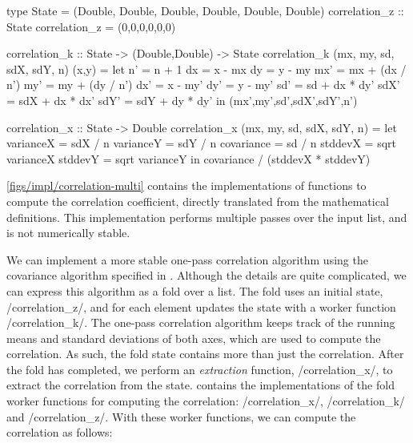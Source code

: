 
\begin{haskell}[float,label=figs/impl/correlation,caption=One-pass correlation implementation]
type State = (Double, Double, Double, Double, Double, Double)
correlation_z :: State
correlation_z = (0,0,0,0,0,0)

correlation_k :: State -> (Double,Double) -> State
correlation_k (mx, my, sd, sdX, sdY, n) (x,y) =
 let n'   = n   + 1
     dx   = x   - mx
     dy   = y   - my
     mx'  = mx  + (dx / n')
     my'  = my  + (dy / n')
     dx'  = x   - my'
     dy'  = y   - my'
     sd'  = sd  + dx * dy'
     sdX' = sdX + dx * dx'
     sdY' = sdY + dy * dy'
 in (mx',my',sd',sdX',sdY',n')

correlation_x :: State -> Double
correlation_x (mx, my, sd, sdX, sdY, n) =
  let varianceX  = sdX / n
      varianceY  = sdY / n
      covariance = sd  / n
      stddevX = sqrt varianceX
      stddevY = sqrt varianceY
  in covariance / (stddevX * stddevY)
\end{haskell}


\cref{figs/impl/correlation-multi} contains the implementations of functions to compute the correlation coefficient, directly translated from the mathematical definitions.
This implementation performs multiple passes over the input list, and is not numerically stable.

We can implement a more stable one-pass correlation algorithm using the covariance algorithm specified in \citet{welford1962note}.
Although the details are quite complicated, we can express this algorithm as a fold over a list.
The fold uses an initial state, \Hs/correlation_z/, and for each element updates the state with a worker function \Hs/correlation_k/.
The one-pass correlation algorithm keeps track of the running means and standard deviations of both axes, which are used to compute the correlation.
As such, the fold state contains more than just the correlation.
After the fold has completed, we perform an \emph{extraction} function, \Hs/correlation_x/, to extract the correlation from the state.
 contains the implementations of the fold worker functions for computing the correlation: \Hs/correlation_x/, \Hs/correlation_k/ and \Hs/correlation_z/.
With these worker functions, we can compute the correlation as follows:

